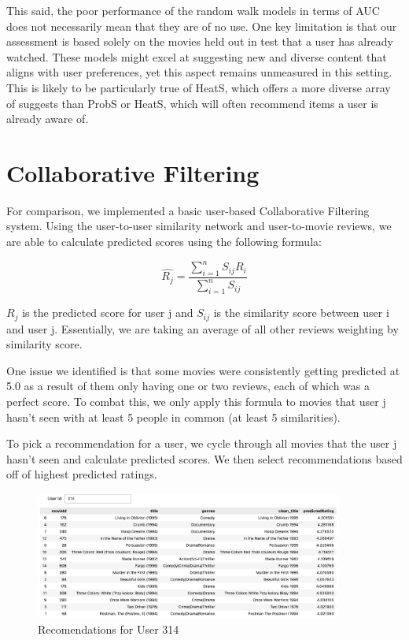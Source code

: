 \documentclass[12pt]{article}
\numberwithin{equation}{section}
\begin{document}
This said, the poor performance of the random walk models in terms of AUC does not necessarily mean that they are of no use. One key limitation is that our assessment is based solely on the movies held out in test that a user has already watched. These models might excel at suggesting new and diverse content that aligns with user preferences, yet this aspect remains unmeasured in this setting. This is likely to be particularly true of HeatS, which offers a more diverse array of suggests than ProbS or HeatS, which will often recommend items a user is already aware of.

\section{Collaborative Filtering}
For comparison, we implemented a basic user-based Collaborative Filtering system. Using the user-to-user similarity network and user-to-movie reviews, we are able to calculate predicted scores using the following formula:

\[
\hat{R_j} = \frac{\sum_{i=1}^n S_{ij}R_i}{\sum_{i=1}^n S_{ij}}
\]

$R_j$ is the predicted score for user j and $S_{ij}$ is the similarity score between user i and user j. Essentially, we are taking an average of all other reviews weighting by similarity score.

One issue we identified is that some movies were consistently getting predicted at 5.0 as a result of them only having one or two reviews, each of which was a perfect score. To combat this, we only apply this formula to movies that user j hasn't seen with at least 5 people in common (at least 5 similarities).

To pick a recommendation for a user, we cycle through all movies that the user j hasn't seen and calculate predicted scores. We then select recommendations based off of highest predicted ratings.

\begin{figure}[h!]
    \begin{minipage}[b]{01\linewidth}
         \centering
  	\includegraphics[width=0.9\textwidth]{314_recs}
  	\caption{Recomendations for User 314}
  	\label{fig:UN_degreeinfo}
    \end{minipage}
\end{figure}
\end{document}

